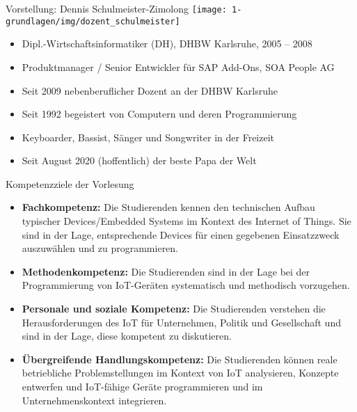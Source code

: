 \begin{frame}{Vorstellung: Dennis Schulmeister-Zimolong}
    \texttt{[image: 1-grundlagen/img/dozent\_schulmeister]}

    \begin{itemize}
        \item Dipl.-Wirtschaftsinformatiker (DH), DHBW Karlsruhe, 2005 – 2008
        \item Produktmanager / Senior Entwickler für SAP Add-Ons, SOA People AG
        \item Seit 2009 nebenberuflicher Dozent an der DHBW Karlsruhe
        \item Seit 1992 begeistert von Computern und deren Programmierung
        \item Keyboarder, Bassist, Sänger und Songwriter in der Freizeit
        \item Seit August 2020 (hoffentlich) der beste Papa der Welt \smiley{}
    \end{itemize}
\end{frame}

\begin{frame}{Kompetenzziele der Vorlesung}
    \begin{itemize}
        \item \textbf{Fachkompetenz:} Die Studierenden kennen den
        \textcolor{NavyBlue}{technischen Aufbau typischer Devices/Embedded Systems}
        im Kontext des Internet of Things. Sie sind in der Lage, entsprechende Devices
        für einen gegebenen Einsatzzweck auszuwählen und zu programmieren.
        \medskip

        \item \textbf{Methodenkompetenz:} Die Studierenden sind in der Lage
        bei der Programmierung von IoT-Geräten systematisch und methodisch vorzugehen.
        \medskip

        \item \textbf{Personale und soziale Kompetenz:} Die Studierenden verstehen die Herausforderungen
        des IoT für Unternehmen, Politik und Gesellschaft und sind in der Lage, diese kompetent zu diskutieren.
        \medskip

        \item \textbf{Übergreifende Handlungskompetenz:} Die Studierenden können reale betriebliche
        Problemstellungen im Kontext von IoT analysieren, \textcolor{NavyBlue}{Konzepte entwerfen}
        und \textcolor{NavyBlue}{IoT-fähige Geräte programmieren} und im Unternehmenskontext integrieren.
        \medskip
    \end{itemize}
\end{frame}

